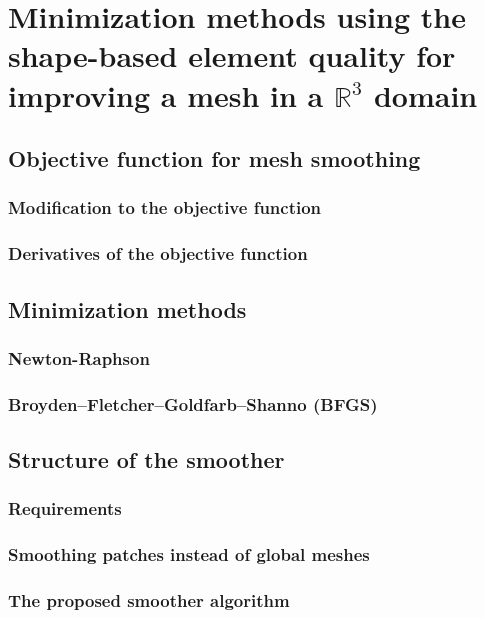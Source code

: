 
\chapter[Minimization methods for improving a mesh in a $\mathbb{R}^{3}$ domain]{Minimization methods using the shape-based element quality for improving a mesh in a $\mathbb{R}^{3}$ domain}
\label{chap:03-methodology}
\thispagestyle{empty}

\section{Objective function for mesh smoothing}

\subsection{Modification to the objective function}

\subsection{Derivatives of the objective function}

\section{Minimization methods}

\subsection{Newton-Raphson}

\subsection{Broyden--Fletcher--Goldfarb--Shanno (BFGS)}

\section{Structure of the smoother}
 
\subsection{Requirements} 

\subsection{Smoothing patches instead of global meshes}
\label{sec:sub-meshes}

\subsection{The proposed smoother algorithm}

